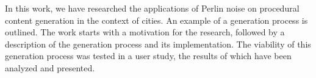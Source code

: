 In this work, we have researched the applications of Perlin noise on procedural content generation in the context of cities. An example of a generation process is outlined. The work starts with a motivation for the research, followed by a description of the generation process and its implementation. The viability of this generation process was tested in a user study, the results of which have been analyzed and presented.